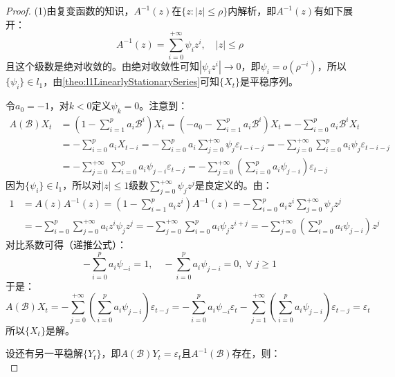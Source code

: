 \begin{proof}
	(1)由复变函数的知识，$A^{-1}(z)$在$\{z:|z|\leqslant\rho\}$内解析，即$A^{-1}(z)$有如下展开：
	\begin{equation*}
		A^{-1}(z)=\sum_{i=0}^{+\infty}\psi_iz^i,\quad|z|\leqslant\rho
	\end{equation*}
	且这个级数是绝对收敛的。由绝对收敛性可知$|\psi_iz^i|\to0$，即$\psi_i=o(\rho^{-i})$，所以$\{\psi_i\}\in l_1$，由\cref{theo:l1LinearlyStationarySeries}可知$\{X_t\}$是平稳序列。\par
	令$a_0=-1$，对$k<0$定义$\psi_k=0$。注意到：
	\begin{align*}
		A(\mathcal{B})X_t&=\left(1-\sum_{i=1}^{p}a_i\mathcal{B}^i\right)X_t=\left(-a_0-\sum_{i=1}^{p}a_i\mathcal{B}^i\right)X_t=-\sum_{i=0}^{p}a_i\mathcal{B}^iX_t \\
		&=-\sum_{i=0}^{p}a_iX_{t-i}=-\sum_{i=0}^{p}a_{i}\sum_{j=0}^{+\infty}\psi_j\varepsilon_{t-i-j}=-\sum_{j=0}^{+\infty}\sum_{i=0}^{p}a_i\psi_j\varepsilon_{t-i-j} \\
		&=-\sum_{j=0}^{+\infty}\sum_{i=0}^{p}a_i\psi_{j-i}\varepsilon_{t-j}=-\sum_{j=0}^{+\infty}\left(\sum_{i=0}^{p}a_i\psi_{j-i}\right)\varepsilon_{t-j}
	\end{align*}
	因为$\{\psi_i\}\in l_1$，所以对$|z|\leqslant1$级数$\sum\limits_{j=0}^{+\infty}\psi_jz^j$是良定义的。由：
	\begin{align*}
		1&=A(z)A^{-1}(z)=\left(1-\sum_{i=1}^{p}a_iz^i\right)A^{-1}(z)=-\sum_{i=0}^{p}a_iz^i\sum_{j=0}^{+\infty}\psi_jz^j \\
		&=-\sum_{i=0}^{p}\sum_{j=0}^{+\infty}a_iz^i\psi_jz^j=-\sum_{j=0}^{+\infty}\sum_{i=0}^{p}a_i\psi_jz^{i+j}=-\sum_{j=0}^{+\infty}\left(\sum_{i=0}^{p}a_i\psi_{j-i}\right)z^j
	\end{align*}
	对比系数可得（递推公式）：
	\begin{equation*}
		-\sum_{i=0}^{p}a_i\psi_{-i}=1,\quad-\sum_{i=0}^{p}a_i\psi_{j-i}=0,\;\forall\;j\geqslant1
	\end{equation*}
	于是：
	\begin{equation*}
		A(\mathcal{B})X_t=-\sum_{j=0}^{+\infty}\left(\sum_{i=0}^{p}a_i\psi_{j-i}\right)\varepsilon_{t-j}=-\sum_{i=0}^{p}a_i\psi_{-i}\varepsilon_t-\sum_{j=1}^{+\infty}\left(\sum_{i=0}^{p}a_i\psi_{j-i}\right)\varepsilon_{t-j}=\varepsilon_t
	\end{equation*}
	所以$\{X_t\}$是解。\par
	设还有另一平稳解$\{Y_t\}$，即$A(\mathcal{B})Y_t=\varepsilon_t$且$A^{-1}(\mathcal{B})$存在，则：
	\begin{equation*}

\end{equation*}
\end{proof}
